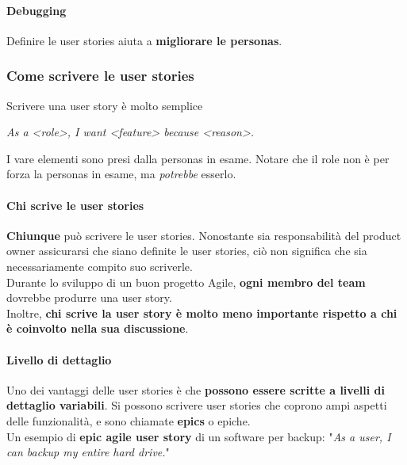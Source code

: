 \documentclass[10pt]{article}
\begin{document}
\paragraph{Debugging} Definire le user stories aiuta a \textbf{migliorare le personas}.
\subsubsection{Come scrivere le user stories}
Scrivere una user story è molto semplice
\begin{center}
\emph{As a <role>, I want <feature> because <reason>.}
\end{center}
I vare elementi sono presi dalla personas in esame. Notare che il role non è per forza la personas in esame, ma \textit{potrebbe} esserlo.
\paragraph{Chi scrive le user stories} \textbf{Chiunque} può scrivere le user stories. Nonostante sia responsabilità del product owner assicurarsi che siano definite le user stories, ciò non significa che sia necessariamente compito suo scriverle.\\
Durante lo sviluppo di un buon progetto Agile, \textbf{ogni membro del team} dovrebbe produrre una user story.\\
Inoltre, \textbf{chi scrive la user story è molto meno importante rispetto a chi è coinvolto nella sua discussione}.
\paragraph{Livello di dettaglio}
Uno dei vantaggi delle user stories è che \textbf{possono essere scritte a livelli di dettaglio variabili}. Si possono scrivere user stories che coprono ampi aspetti delle funzionalità, e sono chiamate \textbf{epics} o epiche.\\
Un esempio di \textbf{epic agile user story} di un software per backup: "\textit{As a user, I can backup my entire hard drive.}"
\end{document}
